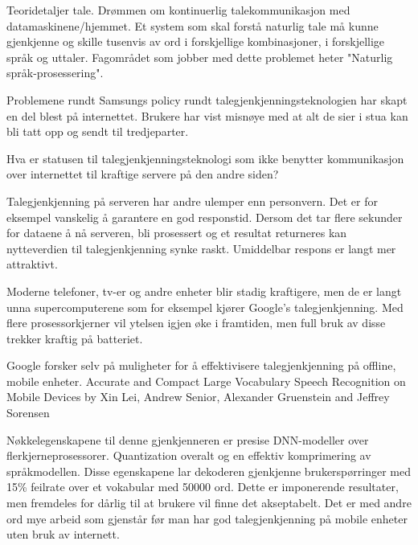 {Teoridetaljer tale.
Drømmen om kontinuerlig talekommunikasjon med datamaskinene/hjemmet. Et system som skal forstå naturlig tale må kunne gjenkjenne og skille tusenvis av ord i forskjellige kombinasjoner, i forskjellige språk og uttaler. Fagområdet som jobber med dette problemet heter "Naturlig språk-prosessering". 


Problemene rundt Samsungs policy rundt talegjenkjenningsteknologien har skapt en del blest på internettet. Brukere har vist misnøye med at alt de sier i stua kan bli tatt opp og sendt til tredjeparter. 

Hva er statusen til talegjenkjenningsteknologi som ikke benytter kommunikasjon over internettet til kraftige servere på den andre siden?  

Talegjenkjenning på serveren har andre ulemper enn personvern. Det er for eksempel vanskelig å garantere en god responstid. Dersom det tar flere sekunder for dataene å nå serveren, bli prosessert og et resultat returneres kan nytteverdien til talegjenkjenning synke raskt. Umiddelbar respons er langt mer attraktivt.

Moderne telefoner, tv-er og andre enheter blir stadig kraftigere, men de er langt unna supercomputerene som for eksempel kjører Google's talegjenkjenning. Med flere prosessorkjerner vil ytelsen igjen øke i framtiden, men full bruk av disse trekker kraftig på batteriet. 

Google forsker selv på muligheter for å effektivisere talegjenkjenning på offline, mobile enheter. {\color{red}Accurate and Compact Large Vocabulary Speech Recognition on Mobile Devices by Xin Lei, Andrew Senior, Alexander Gruenstein and Jeffrey Sorensen} 

Nøkkelegenskapene til denne gjenkjenneren er presise DNN-modeller over flerkjerneprosessorer. Quantization overalt og en effektiv komprimering av språkmodellen. Disse egenskapene lar dekoderen gjenkjenne brukerspørringer med 15\% feilrate over et vokabular med 50000 ord. Dette er imponerende resultater, men fremdeles for dårlig til at brukere vil finne det akseptabelt. Det er med andre ord mye arbeid som gjenstår før man har god talegjenkjenning på mobile enheter uten bruk av internett.

}
